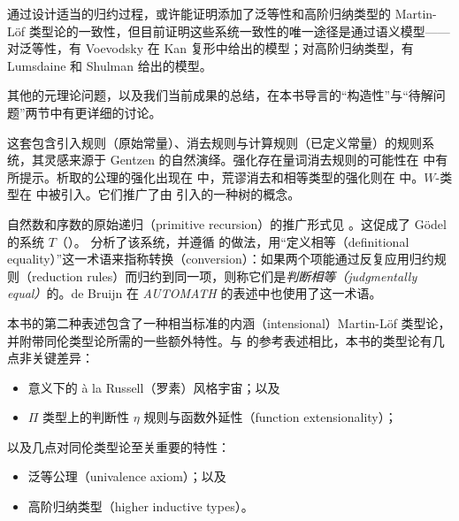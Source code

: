 通过设计适当的归约过程，或许能证明添加了泛等性和高阶归纳类型的 Martin-L\"{o}f 类型论的一致性，但目前证明这些系统一致性的唯一途径是通过语义模型——对泛等性，有 Voevodsky \cite{klv:ssetmodel} 在 Kan 复形中给出的模型；对高阶归纳类型，有 Lumsdaine 和 Shulman \cite{ls:hits} 给出的模型。

其他的元理论问题，以及我们当前成果的总结，在本书导言的``构造性''与``待解问题''两节中有更详细的讨论。

%

\sectionNotes\label{subsec:general-remarks}


这套包含引入规则（原始常量）、消去规则与计算规则（已定义常量）的规则系统，其灵感来源于 Gentzen 的自然演绎。强化存在量词消去规则的可能性在 \cite{howard:pat} 中有所提示。析取的公理的强化出现在 \cite{Martin-Lof-1972} 中，荒谬消去和相等类型的强化则在 \cite{Martin-Lof-1973} 中。$W$-类型在 \cite{Martin-Lof-1979} 中被引入。它们推广了由 \cite{Tait-1968} 引入的一种树的概念。
%


自然数和序数的原始递归（primitive recursion）的推广形式见 \cite{Hilbert-1925}。这促成了 Gödel 的系统 $T$（\cite{Goedel-T-1958}）。\cite{Tait-1966} 分析了该系统，并遵循 \cite{Goedel-T-1958} 的做法，用``定义相等（definitional equality）''这一术语来指称转换（conversion）：如果两个项能通过反复应用归约规则（reduction rules）而归约到同一项，则称它们是\emph{判断相等（judgmentally equal）}的。de Bruijn \cite{deBruijn-1973} 在 \emph{AUTOMATH} 的表述中也使用了这一术语。

本书的第二种表述包含了一种相当标准的内涵（intensional）Martin-L\"{o}f 类型论，并附带同伦类型论所需的一些额外特性。与 \cite{hofmann:syntax-and-semantics} 的参考表述相比，本书的类型论有几点非关键差异：
%

\begin{itemize}
\item \cite{martin-lof:bibliopolis} 意义下的 \`{a} la Russell（罗素）风格宇宙；以及
\item $\Pi$ 类型上的判断性 $\eta$ 规则与函数外延性（function extensionality）；
\end{itemize}


以及几点对同伦类型论至关重要的特性：


\begin{itemize}
\item 泛等公理（univalence axiom）；以及
\item 高阶归纳类型（higher inductive types）。
\end{itemize}


